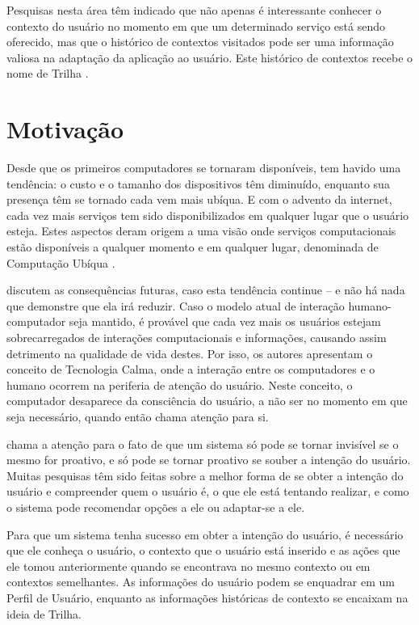 Pesquisas nesta área têm indicado que não apenas é interessante conhecer o contexto do usuário no momento em que um determinado serviço está sendo oferecido, mas que o histórico de contextos visitados pode ser uma informação valiosa na adaptação da aplicação ao usuário. Este histórico de contextos recebe o nome de Trilha \cite{silva10}.



\section{Motivação}
\label{sec:motivacao}

Desde que os primeiros computadores se tornaram disponíveis, tem havido uma tendência: o custo e o tamanho dos dispositivos têm diminuído, enquanto sua presença têm se tornado cada vem mais ubíqua. E com o advento da internet, cada vez mais serviços tem sido disponibilizados em qualquer lugar que o usuário esteja. Estes aspectos deram origem a uma visão onde serviços computacionais estão disponíveis a qualquer momento e em qualquer lugar, denominada de Computação Ubíqua \cite{weiser91}.

 discutem as consequências futuras, caso esta tendência continue -- e não há nada que demonstre que ela irá reduzir. Caso o modelo atual de interação humano-computador seja mantido, é provável que cada vez mais os usuários estejam sobrecarregados de interações computacionais e informações, causando assim detrimento na qualidade de vida destes. Por isso, os autores apresentam o conceito de Tecnologia Calma, onde a interação entre os computadores e o humano ocorrem na periferia de atenção do usuário. Neste conceito, o computador desaparece da consciência do usuário, a não ser no momento em que seja necessário, quando então chama atenção para si.

 chama a atenção para o fato de que um sistema só pode se tornar invisível se o mesmo for proativo, e só pode se tornar proativo se souber a intenção do usuário. Muitas pesquisas têm sido feitas sobre a melhor forma de se obter a intenção do usuário e compreender quem o usuário é, o que ele está tentando realizar, e como o sistema pode recomendar opções a ele ou adaptar-se a ele.

Para que um sistema tenha sucesso em obter a intenção do usuário, é necessário que ele conheça o usuário, o contexto que o usuário está inserido e as ações que ele tomou anteriormente quando se encontrava no mesmo contexto ou em contextos semelhantes. As informações do usuário podem se enquadrar em um Perfil de Usuário, enquanto as informações históricas de contexto se encaixam na ideia de Trilha.

